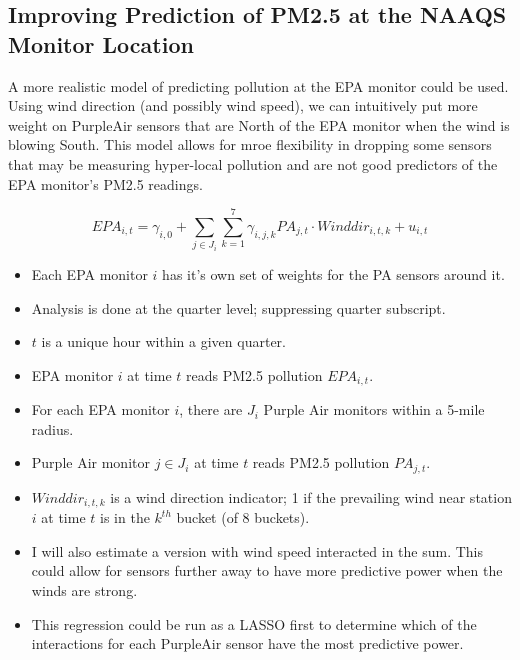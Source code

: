 \documentclass[12pt]{article}
\begin{document}
\subsection{Improving Prediction of PM2.5 at the NAAQS Monitor Location} \label{sec:app-prediction}


A more realistic model of predicting pollution at the EPA monitor could be used. Using wind direction (and possibly wind speed), we can intuitively put more weight on PurpleAir sensors that are North of the EPA monitor when the wind is blowing South. This model allows for mroe flexibility in dropping some sensors that may be measuring hyper-local pollution and are not good predictors of the EPA monitor's PM2.5 readings.

\[
EPA_{i,t} = \gamma_{i,0} + \sum\limits_{j\in J_i}\sum\limits_{k=1}^7\gamma_{i,j,k} 
PA_{j,t} \cdot Winddir_{i,t,k} + u_{i,t}
\]

\begin{itemize}
\item Each EPA monitor $i$ has it's own set of weights for the PA sensors around it.
\item Analysis is done at the quarter level; suppressing quarter subscript.
\item $t$ is a unique hour within a given quarter.
\item EPA monitor $i$ at time $t$ reads PM2.5 pollution $EPA_{i,t}$.
\item For each EPA monitor $i$, there are $J_i$ Purple Air monitors within a 5-mile radius.
\item Purple Air monitor $j\in J_i$ at time $t$ reads PM2.5 pollution $PA_{j,t}$.
\item $Winddir_{i,t,k} $ is a wind direction indicator; 1 if the prevailing wind near station $i$ at time $t$ is in the $k^{th}$ bucket (of 8 buckets).
\item I will also estimate a version with wind speed interacted in the sum. This could allow for sensors further away to have more predictive power when the winds are strong.
\item This regression could be run as a LASSO first to determine which of the interactions for each PurpleAir sensor have the most predictive power.
\end{itemize}
\end{document}
